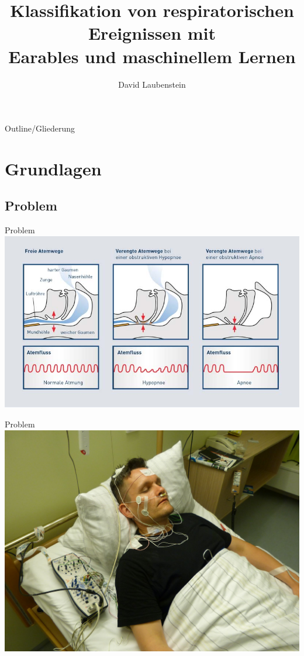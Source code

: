 \documentclass[18pt]{beamer}
\title[]{Klassifikation von respiratorischen Ereignissen mit \\ Earables und maschinellem Lernen}
\subtitle{}
\author{David Laubenstein}
\institute{Institut für Telematik: Pervasive Computing Systems / TECO}
\begin{document}

\begin{frame}
\titlepage
\end{frame}

\begin{frame}{Outline/Gliederung}
\tableofcontents
\end{frame}

\section{Grundlagen}
\subsection{Problem}
\begin{frame}{Problem}
    \includegraphics[scale=0.4]{../Proposal/logos/was-passiert-bei-schlafapnoe}
\end{frame}

\begin{frame}{Problem}
    \includegraphics[scale=0.12]{../Proposal/logos/sleepLabor}
\end{frame}
\end{document}
